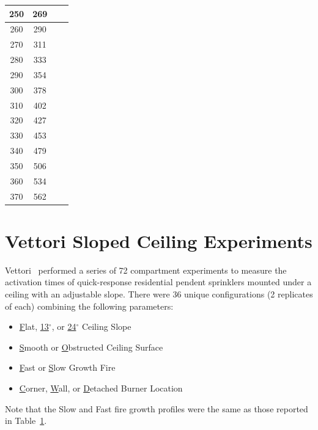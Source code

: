 \begin{table}[h!]
\begin{center}
\begin{tabular}{|c|c|c|c|}
250		&  269     &            &        \\ \hline
260		&  290     &            &        \\ \hline
270		&  311     &            &        \\ \hline
280		&  333     &            &        \\ \hline
290		&  354     &            &        \\ \hline
300		&  378     &            &        \\ \hline
310		&  402     &            &        \\ \hline
320		&  427     &            &        \\ \hline
330		&  453     &            &        \\ \hline
340		&  479     &            &        \\ \hline
350		&  506     &            &        \\ \hline
360		&  534     &            &        \\ \hline
370		&  562     &            &        \\ \hline
\end{tabular}
\end{center}
\label{Vettori_Ramps}
\end{table}
    	
\section{Vettori Sloped Ceiling Experiments}
    	
Vettori~\cite{Vettori:2} performed a series of 72 compartment experiments to measure the activation times of quick-response residential pendent sprinklers mounted under a ceiling with an adjustable slope. There were 36 unique configurations (2 replicates of each) combining the following parameters:
\begin{itemize}
\item \underline{F}lat, \underline{13}$^\circ$, or \underline{24}$^\circ$ Ceiling Slope
\item \underline{S}mooth or \underline{O}bstructed Ceiling Surface
\item \underline{F}ast or \underline{S}low Growth Fire
\item \underline{C}orner, \underline{W}all, or \underline{D}etached Burner Location
\end{itemize}
Note that the Slow and Fast fire growth profiles were the same as those reported in Table~\ref{Vettori_Ramps}.





